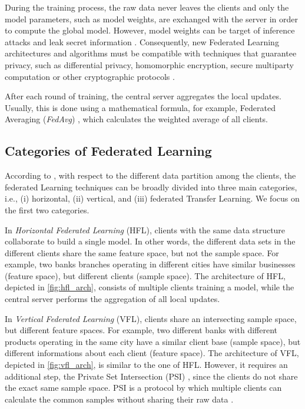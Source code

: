 During the training process, the raw data never leaves the clients and only the model parameters, such as model weights, are exchanged with the server in order to compute the global model. However, model weights can be target of inference attacks and leak secret information \cite{10.1145/3298981}.  Consequently, new Federated Learning architectures and algorithms must be compatible with techniques that guarantee privacy, such as differential privacy, homomorphic encryption, secure multiparty computation or other cryptographic protocols \cite{10.1145/3298981}.

After each round of training, the central server aggregates the local updates. Usually, this is done using a mathematical formula, for example, Federated Averaging (\textit{FedAvg}) \cite{10.48550/arxiv.1602.05629}, which calculates the weighted average of all clients.



\subsection{Categories of Federated Learning}\label{background:archfl}

According to \cite{10.1145/3298981, 10.1145/3412357}, with respect to the different data partition among the clients, the federated Learning techniques can be broadly divided into three main categories, i.e., (i) 
horizontal, (ii) vertical, and (iii) federated Transfer Learning. We focus on the first two categories.

In \textit{Horizontal Federated Learning} (HFL), clients with the same data structure collaborate to build a single model. In other words, the different data sets in the different clients share the same feature space, but not the sample space. For example, two banks branches operating in different cities have similar businesses (feature space), but different clients (sample space). The architecture of HFL, depicted in \autoref{fig:hfl_arch}, consists of multiple clients training a model, while the central server performs the aggregation of all local updates.

In \textit{Vertical Federated Learning} (VFL), clients share an intersecting sample space, but different feature spaces. For example, two different banks with different products operating in the same city have a similar client base (sample space), but different informations about each client (feature space). The architecture of VFL, depicted in \autoref{fig:vfl_arch}, is similar to the one of HFL. However, it requires an additional step, the Private Set Intersection (PSI) \cite{wei2022vertical}, since the clients do not share the exact same sample space. PSI is a protocol by which multiple clients can calculate the common samples without sharing their raw data \cite{wei2022vertical}.

